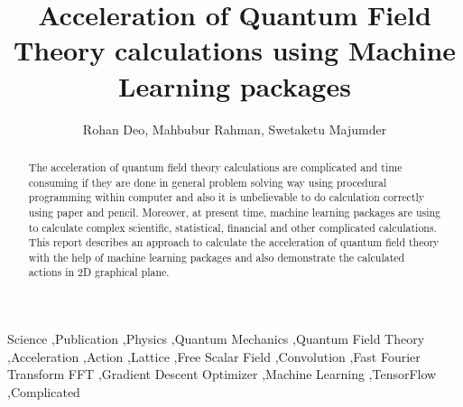 \documentclass[preprint,12pt]{elsarticle}
\begin{document}
\begin{frontmatter}


\title{Acceleration of Quantum Field Theory calculations using Machine Learning packages}




\author{Rohan Deo, Mahbubur Rahman, Swetaketu Majumder}

\address{Fulda University of Applied Sciences, Germany}

\begin{abstract}
The acceleration of quantum field theory calculations are complicated and time consuming if they are done in general problem solving way using procedural programming within computer and also it is unbelievable to do calculation correctly using paper and pencil. Moreover, at present time, machine learning packages are using to calculate complex scientific, statistical, financial and other complicated calculations. This report describes an approach to calculate the acceleration of quantum field theory with the help of machine learning packages and also demonstrate the calculated actions in 2D graphical plane.    
\end{abstract}

\begin{keyword}
Science \sep Publication \sep Physics \sep Quantum Mechanics \sep Quantum Field Theory \sep Acceleration \sep Action \sep Lattice \sep Free Scalar Field \sep Convolution \sep Fast Fourier Transform FFT \sep Gradient Descent Optimizer \sep Machine Learning \sep TensorFlow \sep Complicated


\end{keyword}

\end{frontmatter}
\end{document}
